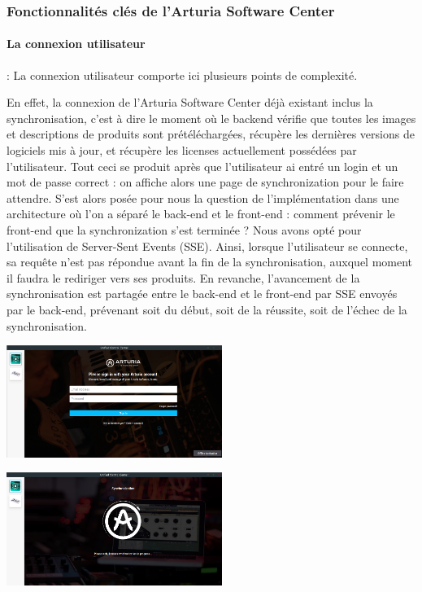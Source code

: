 \documentclass[francais]{rapportPFE}  %
\begin{document}
\subsubsection{Fonctionnalités clés de l'Arturia Software Center}
\paragraph{La connexion utilisateur}: La connexion utilisateur comporte ici plusieurs points de complexité. 

En effet, la connexion de l'Arturia Software Center déjà existant inclus la synchronisation, c'est à dire le moment où le backend vérifie que toutes les images et descriptions de produits sont prétéléchargées, récupère les dernières versions de logiciels mis à jour, et récupère les licenses actuellement possédées par l'utilisateur. Tout ceci se produit après que l'utilisateur ai entré un login et un mot de passe correct : on affiche alors une page de synchronization pour le faire attendre. S'est alors posée pour nous la question de l'implémentation dans une architecture où l'on a séparé le back-end et le front-end : comment prévenir le front-end que la synchronization s'est terminée ? Nous avons opté pour l'utilisation de Server-Sent Events (SSE). Ainsi, lorsque l'utilisateur se connecte, sa requête n'est pas répondue avant la fin de la synchronisation, auxquel moment il faudra le rediriger vers ses produits. En revanche, l'avancement de la synchronisation est partagée entre le back-end et le front-end par SSE envoyés par le back-end, prévenant soit du début, soit de la réussite, soit de l'échec de la synchronisation.
\begin{center}
    \centering
    \begin{minipage}{.5\textwidth}
    \centering
    \includegraphics[width=7cm]{graphics/disconnected.png}
    \label{fig:test1}
    \end{minipage}%
    \begin{minipage}{.5\textwidth}
    \centering
    \includegraphics[width=7cm]{graphics/sync.png}
    \label{fig:test2}
    \end{minipage}
    \end{center}
\end{document}
